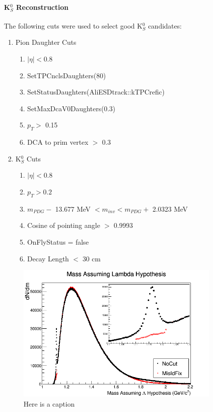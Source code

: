 \paragraph{K$^{0}_{S}$ Reconstruction}
\label{K0sReconstruction}

The following cuts were used to select good K$^{0}_{S}$ candidates:

\begin{enumerate}
 \item{Pion Daughter Cuts}
 \begin{enumerate}
  \item $|\eta| < 0.8$
  \item SetTPCnclsDaughters(80)
  \item SetStatusDaughters(AliESDtrack::kTPCrefic)
  \item SetMaxDcaV0Daughters(0.3)
  \item $p_{T} >$ 0.15
  \item DCA to prim vertex $>$ 0.3
 \end{enumerate}

 \item K$^{0}_{S}$ Cuts
 \begin{enumerate}
  \item $|\eta| < 0.8$
  \item $p_{T} > 0.2$
  \item $m_{PDG} -$ 13.677 MeV $< m_{inv} < m_{PDG} +$ 2.0323 MeV
  \item Cosine of pointing angle $>$ 0.9993
  \item OnFlyStatus = false
  \item Decay Length $<$ 30 cm
 \end{enumerate}  
 
\end{enumerate}

\begin{figure}
  \centering
  \includegraphics[width=100mm]{3_DataSelection/Figures/MassAssumingLambdaHypothesis.png}
  \caption{Here is a caption}
  \label{fig:MassAssLamHyp}
\end{figure}